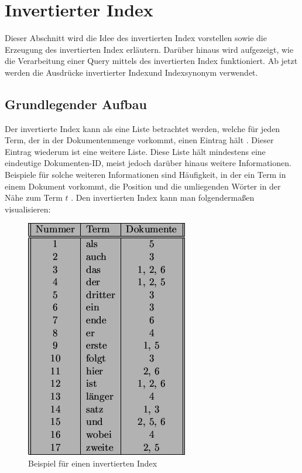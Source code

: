 \section{Invertierter Index}
Dieser Abschnitt wird die Idee des invertierten Index vorstellen sowie die Erzeugung des invertierten Index erläutern. Darüber hinaus wird aufgezeigt, wie die Verarbeitung einer Query mittels des invertierten Index funktioniert. Ab jetzt werden die Ausdrücke \glqq invertierter Index\grqq und \glqq Index\grqq synonym verwendet.
\subsection{Grundlegender Aufbau}
Der invertierte Index kann als eine Liste betrachtet werden, welche für jeden Term, der in der Dokumentenmenge vorkommt, einen Eintrag hält \cite{IR_Intro_Cambridge} \cite{IR_Uni_Bamberg}. Dieser Eintrag wiederum ist eine weitere Liste. Diese Liste hält mindestens eine eindeutige Dokumenten-ID, meist jedoch darüber hinaus weitere Informationen. Beispiele für solche weiteren Informationen sind Häufigkeit, in der ein Term in einem Dokument vorkommt, die Position und die umliegenden Wörter in der Nähe zum Term $t$ \cite{IR_Intro_Cambridge}.
\newline
Den invertierten Index kann man folgendermaßen visualisieren:
\begin{figure}[H]
	\centering
	\includegraphics[scale=0.5]{../Abbildungen/index.png}
	\caption{Beispiel für einen invertierten Index \cite{index_Uni_Munich}}
\end{figure}

